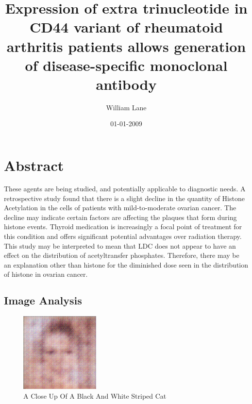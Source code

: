 \documentclass{article}%
\title{Expression of extra trinucleotide in CD44 variant of rheumatoid arthritis patients allows generation of disease{-}specific monoclonal antibody}%
\author{William Lane}%
\affil{Institute of Pharmacology, Toxicology and Pharmacy, Ludwig{-}Maximilians{-}University, Munich, Germany}%
\date{01{-}01{-}2009}%
\begin{document}
%
\normalsize%
\maketitle%
\section{Abstract}%
\label{sec:Abstract}%
These agents are being studied, and potentially applicable to diagnostic needs.\newline%
A retrospective study found that there is a slight decline in the quantity of Histone Acetylation in the cells of patients with mild{-}to{-}moderate ovarian cancer. The decline may indicate certain factors are affecting the plaques that form during histone events. Thyroid medication is increasingly a focal point of treatment for this condition and offers significant potential advantages over radiation therapy.\newline%
This study may be interpreted to mean that LDC does not appear to have an effect on the distribution of acetyltransfer phosphates. Therefore, there may be an explanation other than histone for the diminished dose seen in the distribution of histone in ovarian cancer.

%
\subsection{Image Analysis}%
\label{subsec:ImageAnalysis}%


\begin{figure}[h!]%
\centering%
\includegraphics[width=150px]{500_fake_images/samples_5_26.png}%
\caption{A Close Up Of A Black And White Striped Cat}%
\end{figure}

%
\end{document}
